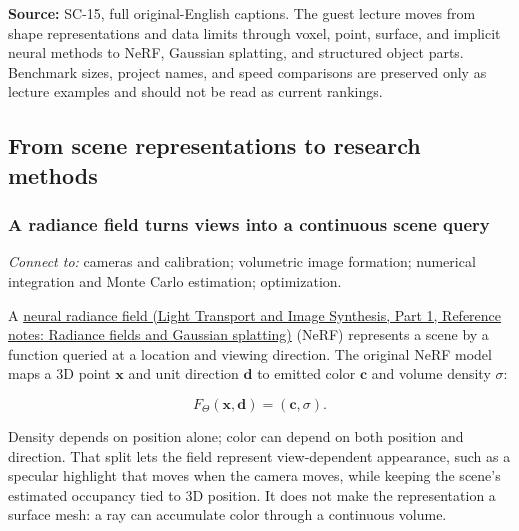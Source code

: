 \textbf{Source:} SC-15, full original-English captions. The guest lecture moves from shape representations and data limits through voxel, point, surface, and implicit neural methods to NeRF, Gaussian splatting, and structured object parts. Benchmark sizes, project names, and speed comparisons are preserved only as lecture examples and should not be read as current rankings.

\subsection{From scene representations to research methods}\label{04-visual-computing-ii-ch034-from-scene-representations-to-research-methods}

\hypertarget{04-visual-computing-ii-ch034-from-scene-representations-to-research-methods}{}

\subsubsection{A radiance field turns views into a continuous scene query}\label{04-visual-computing-ii-ch034-a-radiance-field-turns-views-into-a-continuous-scene-query}

\hypertarget{04-visual-computing-ii-ch034-a-radiance-field-turns-views-into-a-continuous-scene-query}{}

\emph{Connect to:} cameras and calibration; volumetric image formation; numerical integration and Monte Carlo estimation; optimization.

A \href{../04-Light-Transport-and-Image-Synthesis-P01/main.pdf\#nameddest=appendix-c5b332e400e7}{neural radiance field (Light Transport and Image Synthesis, Part 1, Reference notes: Radiance fields and Gaussian splatting)} (NeRF) represents a scene by a function queried at a location and viewing direction. The original NeRF model maps a 3D point \(\mathbf{x}\) and unit direction \(\mathbf{d}\) to emitted color \(\mathbf{c}\) and volume density \(\sigma\):

\[F_\Theta(\mathbf{x},\mathbf{d})=(\mathbf{c},\sigma).\]

Density depends on position alone; color can depend on both position and direction. That split lets the field represent view-dependent appearance, such as a specular highlight that moves when the camera moves, while keeping the scene's estimated occupancy tied to 3D position. It does not make the representation a surface mesh: a ray can accumulate color through a continuous volume.

